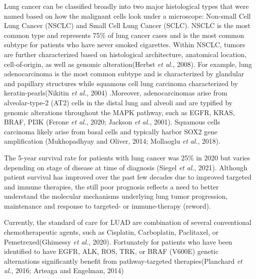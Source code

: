 Lung cancer can be classified broadly into two major histological types that were named based on how the malignant cells look under a microscope: Non-small Cell Lung Cancer (NSCLC) and Small Cell Lung Cancer (SCLC). NSCLC is the most common type and represents 75\% of lung cancer cases and is the most common subtype for patients who have never smoked cigarettes. Within NSCLC, tumors are further characterized based on histological architecture, anatomical location, cell-of-origin, as well as genomic alteration(Herbst \emph{et al.}, 2008). For example, lung adenocarcinoma is the most common subtype and is characterized by glandular and papillary structures while squamous cell lung carcinoma characterized by keratin-pearls(Nikitin \emph{et al.}, 2004) .Moreover, adenocarcinomas arise from alveolar-type-2 (AT2) cells in the distal lung and alveoli and are typified by genomic alterations throughout the MAPK pathway, such as EGFR, KRAS, BRAF, PI3K (Ferone \emph{et al.}, 2020; Jackson \emph{et al.}, 2001). Squamous cells carcinoma likely arise from basal cells and typically harbor SOX2 gene amplification (Mukhopadhyay and Oliver, 2014; Mollaoglu \emph{et al.}, 2018).

The 5-year survival rate for patients with lung cancer was 25\% in 2020 but varies depending on stage of disease at time of diagnosis (Siegel \emph{et al.}, 2021). Although patient survival has improved over the past few decades due to improved targeted and immune therapies, the still poor prognosis reflects a need to better understand the molecular mechanisms underlying lung tumor progression, maintenance and response to targeted- or immune-therapy (reword).

Currently, the standard of care for LUAD are combination of several conventional chemotherapeutic agents, such as Cisplatin, Carboplatin, Paclitaxel, or Pemetrexed(Ghimessy \emph{et al.}, 2020). Fortunately for patients who have been identified to have EGFR, ALK, ROS, TRK, or BRAF (V600E) genetic alternations significantly benefit from pathway-targeted therapies(Planchard \emph{et al.}, 2016; Arteaga and Engelman, 2014)

